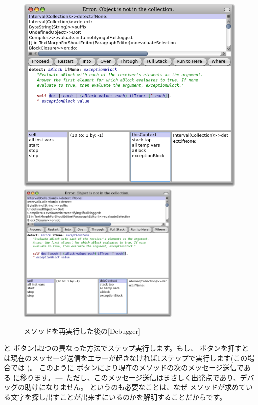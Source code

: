 \documentclass[a4paper,10pt,twoside]{book}
\begin{document}
\begin{figure}[btp]
	\begin{center}
	\ifluluelse
		{\includegraphics[width=\textwidth]{RestartDetectIfNone}}
		{\includegraphics[width=0.7\textwidth]{RestartDetectIfNone}}
	\end{center}
	\caption{ メソッドを再実行した後の[Debugger]}
\end{figure}

 と  ボタンは2つの異なった方法でステップ実行します。もし、 ボタンを押すと \pharo は現在のメッセージ送信をエラーが起きなければ1ステップで実行します(この場合では )。
このように  ボタンにより現在のメソッドの次のメッセージ送信である  に移ります。\,---\, ただし、このメッセージ送信はまさしく出発点であり、デバッグの助けになりません。
というのも必要なことは、なぜ  メソッドが求めている文字を探し出すことが出来ずにいるのかを解明することだからです。
\end{document}
